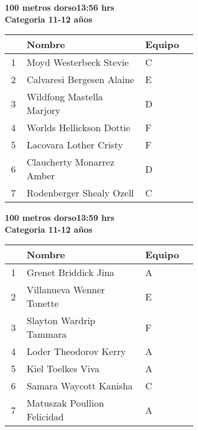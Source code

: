 \begin{minipage}{0.95\linewidth}\vspace{0.5cm} 
\begin{flushleft}
\textbf{
\hspace{-0.15cm}100 metros dorso\hspace{1.5cm}13:56 hrs \\Categoria 11-12 años}\vspace{-0.2cm} 
\end{flushleft}
\begin{tabular}{cp{0.63\linewidth}l}
\hline
& \textbf{Nombre} & \textbf{Equipo} \\ \hline
1 & Moyd Westerbeck Stevie & C \\ 
2 & Calvaresi Bergesen Alaine & E \\ 
3 & Wildfong Mastella Marjory & D \\ 
4 & Worlds Hellickson Dottie & F \\ 
5 & Lacovara Lother Cristy & F \\ 
6 & Claucherty Monarrez Amber & D \\ 
7 & Rodenberger Shealy Ozell & C \\ 
\end{tabular}
\end{minipage}
\begin{minipage}{0.95\linewidth}\vspace{0.5cm} 
\begin{flushleft}
\textbf{
\hspace{-0.15cm}100 metros dorso\hspace{1.5cm}13:59 hrs \\Categoria 11-12 años}\vspace{-0.2cm} 
\end{flushleft}
\begin{tabular}{cp{0.63\linewidth}l}
\hline
& \textbf{Nombre} & \textbf{Equipo} \\ \hline
1 & Grenet Briddick Jina & A \\ 
2 & Villanueva Wenner Tonette & E \\ 
3 & Slayton Wardrip Tammara & F \\ 
4 & Loder Theodorov Kerry & A \\ 
5 & Kiel Toelkes Viva & A \\ 
6 & Samara Waycott Kanisha & C \\ 
7 & Matuszak Poullion Felicidad & A \\ 
\end{tabular}
\end{minipage}
